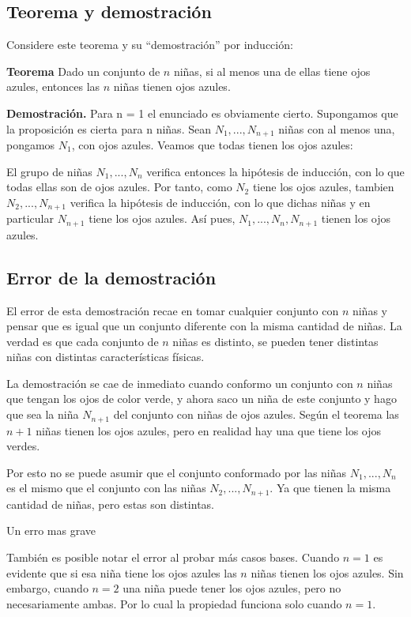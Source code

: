 \documentclass[../doc.tex]{subfiles}
\begin{document}
\subsection{Teorema y demostración}
Considere este teorema y su “demostración” por inducción:

\textbf{Teorema} Dado un conjunto de \(n\) niñas, si al menos una de ellas tiene
ojos azules, entonces las \(n\) niñas tienen ojos azules.

\textbf{Demostración.} Para n = 1 el enunciado es obviamente cierto. Supongamos
que la proposición es cierta para n niñas.
Sean \(N_1, ... , N_{n+1}\) niñas con al menos una, pongamos \(N_1\), con ojos azules.
Veamos que todas tienen los ojos azules:

El grupo de niñas \(N_1, ... , N_n\) verifica entonces la hipótesis de inducción,
con lo que todas ellas son de ojos azules. Por tanto, como \(N_2\) tiene los ojos azules,
tambien \(N_2, ... , N_{n+1}\) verifica la hipótesis de inducción, con lo que dichas niñas
y en particular \(N_{n+1}\) tiene los ojos azules. Así pues, \(N_1, ... , N_n, N_{n+1}\)
tienen los ojos azules.

\subsection{Error de la demostración}

El error de esta demostración recae en tomar cualquier conjunto con \(n\) niñas y pensar
que es igual que un conjunto diferente con la misma cantidad de niñas. La verdad es que
cada conjunto de \(n\) niñas es distinto, se pueden tener distintas niñas con
distintas características físicas.

La demostración se cae de inmediato cuando conformo un conjunto con \(n\) niñas
que tengan los ojos de color verde, y ahora saco un niña de este conjunto y hago que sea
la niña \(N_{n+1}\) del conjunto con niñas de ojos azules. Según el teorema las \(n + 1\)
niñas tienen los ojos azules, pero en realidad hay una que tiene los ojos verdes.

Por esto no se puede asumir que el conjunto conformado por las niñas \(N_1, ... ,
N_n\) es el mismo que el conjunto con las niñas \(N_2, ... , N_{n+1}\). Ya que tienen la
misma cantidad de niñas, pero estas son distintas.

Un erro mas grave 

También es posible notar el error al probar más casos bases. Cuando \(n = 1\)
es evidente que si esa niña tiene los ojos azules las \(n\) niñas tienen los ojos azules.
Sin embargo, cuando \(n = 2\) una niña puede tener los ojos azules, pero no necesariamente
ambas. Por lo cual la propiedad funciona solo cuando \(n = 1\).
\end{document}
